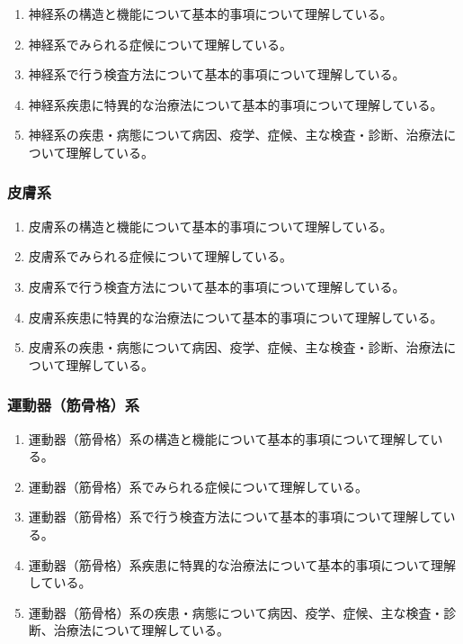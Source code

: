 \begin{enumerate}
\def\labelenumi{\arabic{enumi}.}
\tightlist
\item
  神経系の構造と機能について基本的事項について理解している。
\item
  神経系でみられる症候について理解している。
\item
  神経系で行う検査方法について基本的事項について理解している。
\item
  神経系疾患に特異的な治療法について基本的事項について理解している。
\item
  神経系の疾患・病態について病因、疫学、症候、主な検査・診断、治療法について理解している。
\end{enumerate}

\hypertarget{ux76aeux819aux7cfb}{%
\subsubsection{皮膚系}\label{ux76aeux819aux7cfb}}

\begin{enumerate}
\def\labelenumi{\arabic{enumi}.}
\tightlist
\item
  皮膚系の構造と機能について基本的事項について理解している。
\item
  皮膚系でみられる症候について理解している。
\item
  皮膚系で行う検査方法について基本的事項について理解している。
\item
  皮膚系疾患に特異的な治療法について基本的事項について理解している。
\item
  皮膚系の疾患・病態について病因、疫学、症候、主な検査・診断、治療法について理解している。
\end{enumerate}

\hypertarget{ux904bux52d5ux5668ux7b4bux9aa8ux683cux7cfb}{%
\subsubsection{運動器（筋骨格）系}\label{ux904bux52d5ux5668ux7b4bux9aa8ux683cux7cfb}}

\begin{enumerate}
\def\labelenumi{\arabic{enumi}.}
\tightlist
\item
  運動器（筋骨格）系の構造と機能について基本的事項について理解している。
\item
  運動器（筋骨格）系でみられる症候について理解している。
\item
  運動器（筋骨格）系で行う検査方法について基本的事項について理解している。
\item
  運動器（筋骨格）系疾患に特異的な治療法について基本的事項について理解している。
\item
  運動器（筋骨格）系の疾患・病態について病因、疫学、症候、主な検査・診断、治療法について理解している。
\end{enumerate}

